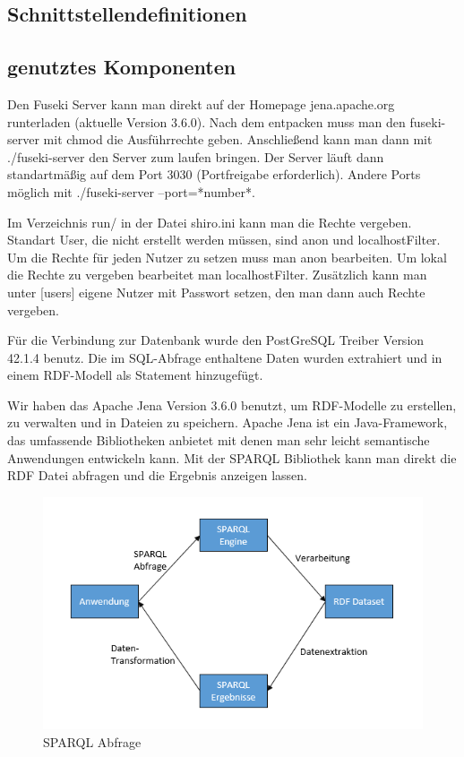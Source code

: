 \subsection{Schnittstellendefinitionen}

\subsection{genutztes Komponenten}


Den Fuseki Server kann man direkt auf der Homepage jena.apache.org runterladen (aktuelle Version 3.6.0).
Nach dem entpacken muss man den fuseki-server mit chmod die Ausführrechte geben.
Anschließend kann man dann mit ./fuseki-server den Server zum laufen bringen.
Der Server läuft dann standartmäßig auf dem Port 3030 (Portfreigabe erforderlich).
Andere Ports möglich mit ./fuseki-server --port=*number*.

Im Verzeichnis run/ in der Datei shiro.ini kann man die Rechte vergeben.
Standart User, die nicht erstellt werden müssen, sind anon und localhostFilter.
Um die Rechte für jeden Nutzer zu setzen muss man anon bearbeiten.
Um lokal die Rechte zu vergeben bearbeitet man localhostFilter.
Zusätzlich kann man unter [users] eigene Nutzer mit Passwort setzen, den man dann auch Rechte vergeben.

Für die Verbindung zur Datenbank wurde den PostGreSQL Treiber Version 42.1.4 benutz. Die im SQL-Abfrage enthaltene Daten wurden extrahiert und in einem RDF-Modell als Statement hinzugefügt.\newline

Wir haben das Apache Jena Version 3.6.0 benutzt, um RDF-Modelle zu erstellen, zu verwalten und in Dateien zu speichern. Apache Jena ist ein Java-Framework, das umfassende Bibliotheken anbietet mit denen man sehr leicht semantische Anwendungen entwickeln kann.\newline
Mit der SPARQL Bibliothek kann man direkt die RDF Datei abfragen und die Ergebnis anzeigen lassen.

\begin{figure}
	\centering
		\includegraphics{sparql/sparql-abfrage.PNG}
		\caption{SPARQL Abfrage}
	\label{fig:sparql-abfrage}
\end{figure}

